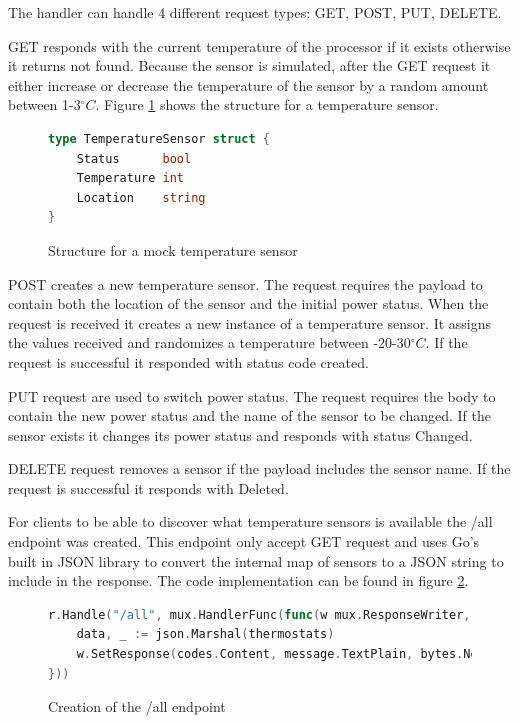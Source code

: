 The handler can handle 4 different request types: GET, POST, PUT, DELETE. 

GET responds with the current temperature of the processor if it exists otherwise it returns not found. Because the sensor is simulated, after the GET request it either increase or decrease the temperature of the sensor by a random amount between 1-3$^{\circ}C$. Figure \ref{code:temp:struct} shows the structure for a temperature sensor.

\begin{figure}[H]
    \begin{lstlisting}[language=go]
type TemperatureSensor struct {
    Status      bool
    Temperature int
    Location    string
}
\end{lstlisting}
    \caption{Structure for a mock temperature sensor}
    \label{code:temp:struct}
\end{figure}

POST creates a new temperature sensor. The request requires the payload to contain both the location of the sensor and the initial power status. When the request is received it creates a new instance of a temperature sensor. It assigns the values received and randomizes a temperature between -20-30$^{\circ}C$. If the request is successful it responded with status code created.

PUT request are used to switch power status. The request requires the body to contain the new power status and the name of the sensor to be changed. If the
sensor exists it changes its power status and responds with status Changed.

DELETE request removes a sensor if the payload includes the sensor name. If the request is successful it responds with Deleted.

For clients to be able to discover what temperature sensors is available the /all endpoint was created. This endpoint only accept GET request and uses Go's built in JSON library to convert the internal map of sensors to a JSON string to include in the response. The code implementation can be found in figure \ref{code:temp:all}.

\begin{figure}[H]
    \begin{lstlisting}[language=go]
r.Handle("/all", mux.HandlerFunc(func(w mux.ResponseWriter, r *mux.Message) {
    data, _ := json.Marshal(thermostats)
    w.SetResponse(codes.Content, message.TextPlain, bytes.NewReader(data))
}))
\end{lstlisting}
    \caption{Creation of the /all endpoint}
    \label{code:temp:all}
\end{figure}

